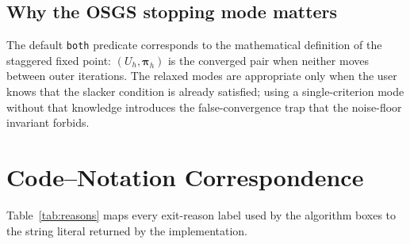 \documentclass{article}
\newcommand{\code}[1]{\texttt{\small #1}}
\begin{document}
\subsection{Why the OSGS stopping mode matters}

The default \code{both} predicate corresponds to the mathematical
definition of the staggered fixed point: $(U_h, \boldsymbol{\pi}_h)$
is the converged pair when neither moves between outer iterations. The
relaxed modes are appropriate only when the user knows that the
slacker condition is already satisfied; using a single-criterion mode
without that knowledge introduces the false-convergence trap that the
noise-floor invariant forbids.

\appendix
\section{Code--Notation Correspondence}
\label{sec:appendix-codes}

Table~\ref{tab:reasons} maps every exit-reason label used by the
algorithm boxes to the string literal returned by the implementation.
\end{document}
